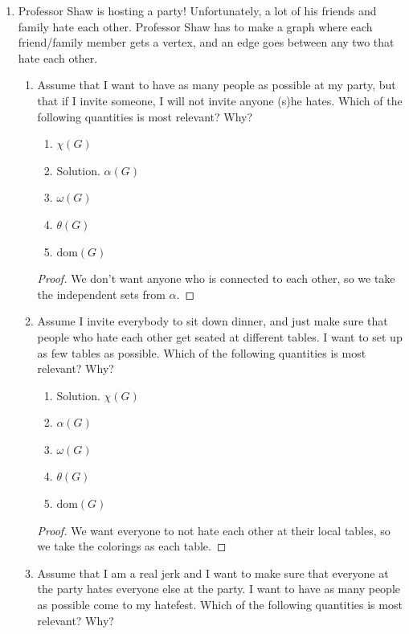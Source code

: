 \documentclass[11pt]{article}
\begin{document}
\begin{enumerate}[leftmargin=*]
\begin{proof}
\begin{enumerate}
\begin{graphfig}{NUM}
        \end{graphfig}
        Therefore 2. \color{red}Good! Finding the ends of the graphs was hard in the TeX though.\color{black}
\end{enumerate}
\end{proof}
\item Professor Shaw is hosting a party! Unfortunately, a lot of his friends and family hate each other. Professor Shaw has to make a graph where each friend/family member gets a vertex, and an edge goes between any two that hate each other. 
\begin{enumerate}[label=\alph*.]
    \item Assume that I want to have as many people as possible at my party, but that if I invite someone, I will not invite anyone (s)he hates. Which of the following quantities is most relevant? Why? 
    \begin{enumerate}
        \item $\chi(G)$
        \item \color{red}Solution. $\alpha(G)$\color{black}
        \item $\omega(G)$
        \item $\theta(G)$
        \item $\text{dom}(G)$
    \end{enumerate}
    \begin{proof}
        We don't want anyone who is connected to each other, so we take the independent sets from $\alpha.$        
    \end{proof}
    \item Assume I invite everybody to sit down dinner, and just make sure that people who hate each other get seated at different tables. I want to set up as few tables as possible. Which of the following quantities is most relevant? Why? 
    \begin{enumerate}
        \item \color{red} Solution. $\chi(G)$\color{black}
        \item $\alpha(G)$
        \item $\omega(G)$
        \item $\theta(G)$
        \item $\text{dom}(G)$
    \end{enumerate}
    \begin{proof}
        We want everyone to not hate each other at their local tables, so we take the colorings as each table.
    \end{proof}
    \item Assume that I am a real jerk and I want to make sure that everyone at the party hates everyone else at the party. I want to have as many people as possible come to my hatefest. Which of the following quantities is most relevant? Why? 

\end{enumerate}
\end{enumerate}
\end{document}
